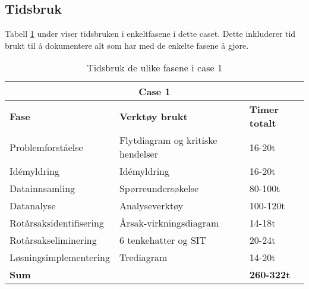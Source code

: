 \subsection{Tidsbruk}
Tabell \ref{tab:tidsbruk_case1} under viser tidsbruken i enkeltfasene i dette caset. Dette inkluderer tid brukt til å dokumentere alt som har med de enkelte fasene å gjøre. 

\begin{table}[H]
  \centering
  \caption{Tidsbruk de ulike fasene i case 1}
    \begin{tabular}{|lr|l|}
    \hline
    \multicolumn{3}{|c|}{\cellcolor{yellow}\textbf{Case 1}} \\ 
    \hline
    \multicolumn{1}{|l|}{\cellcolor{apricot}\textbf{Fase}} & \multicolumn{1}{l|}{\cellcolor{apricot}\textbf{Verktøy brukt}} & \cellcolor{apricot}\textbf{Timer totalt} \\
    \hline
    \multicolumn{1}{|l|}{Problemforståelse} & \multicolumn{1}{l|}{Flytdiagram og kritiske hendelser} & 16-20t \\
    \hline
    \multicolumn{1}{|l|}{Idémyldring} & \multicolumn{1}{l|}{Idémyldring} & 16-20t \\
    \hline
    \multicolumn{1}{|l|}{Datainnsamling} & \multicolumn{1}{l|}{Spørreundersøkelse} & 80-100t \\
    \hline
    \multicolumn{1}{|l|}{Datanalyse} & \multicolumn{1}{l|}{Analyseverktøy} & 100-120t \\
    \hline
    \multicolumn{1}{|l|}{Rotårsaksidentifisering} & \multicolumn{1}{l|}{Årsak-virkningsdiagram} & 14-18t \\
    \hline
    \multicolumn{1}{|l|}{Rotårsakseliminering} & \multicolumn{1}{l|}{6 tenkehatter og SIT} & 20-24t \\
    \hline
    \multicolumn{1}{|l|}{Løsningsimplementering} & \multicolumn{1}{l|}{Trediagram} & 14-20t \\
    \hline
    \multicolumn{2}{|l|}{\textbf{Sum}} & \textbf{260-322t} \\
    \hline
    \end{tabular}%
  \label{tab:tidsbruk_case1}%
\end{table}%


